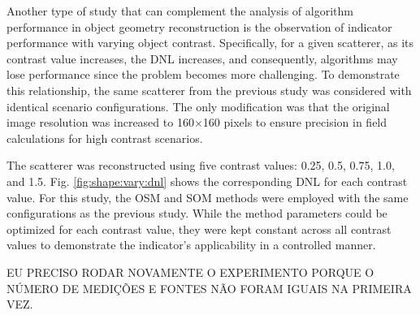 \documentclass{IEEEtran}
\begin{document}
                Another type of study that can complement the analysis of algorithm performance in object geometry reconstruction is the observation of indicator performance with varying object contrast. Specifically, for a given scatterer, as its contrast value increases, the DNL increases, and consequently, algorithms may lose performance since the problem becomes more challenging. To demonstrate this relationship, the same scatterer from the previous study was considered with identical scenario configurations. The only modification was that the original image resolution was increased to 160$\times$160 pixels to ensure precision in field calculations for high contrast scenarios. 

                The scatterer was reconstructed using five contrast values: 0.25, 0.5, 0.75, 1.0, and 1.5. Fig. \ref{fig:shape:vary:dnl} shows the corresponding DNL for each contrast value. For this study, the OSM and SOM methods were employed with the same configurations as the previous study. While the method parameters could be optimized for each contrast value, they were kept constant across all contrast values to demonstrate the indicator's applicability in a controlled manner.

                {\color{red} EU PRECISO RODAR NOVAMENTE O EXPERIMENTO PORQUE O NÚMERO DE MEDIÇÕES E FONTES NÃO FORAM IGUAIS NA PRIMEIRA VEZ.}
\end{document}
